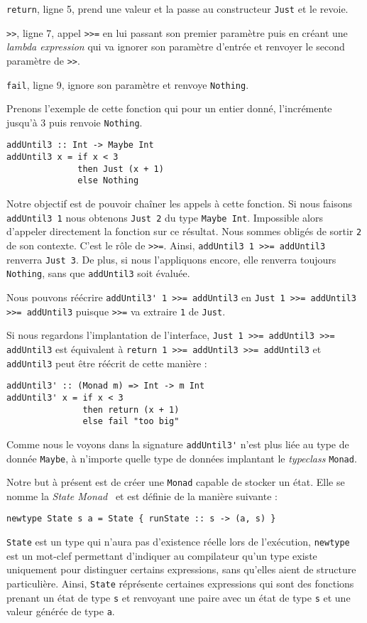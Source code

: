 \documentclass{llncs}
\begin{document}
\lstinline{return}, ligne 5, prend une valeur et la passe au constructeur
\lstinline{Just} et le revoie.

\lstinline{>>}, ligne 7, appel \lstinline{>>=} en lui passant son premier paramètre
puis en créant une \emph{lambda expression} qui va ignorer son paramètre d'entrée
et renvoyer le second paramètre de \lstinline{>>}.

\lstinline{fail}, ligne 9, ignore son paramètre et renvoye \lstinline{Nothing}.

Prenons l'exemple de cette fonction qui pour un entier donné, l'incrémente jusqu'à
3 puis renvoie \lstinline{Nothing}.
\begin{lstlisting}
addUntil3 :: Int -> Maybe Int
addUntil3 x = if x < 3
              then Just (x + 1)
              else Nothing
\end{lstlisting}

Notre objectif est de pouvoir chaîner les appels à cette fonction.
Si nous faisons \lstinline{addUntil3 1} nous obtenons \lstinline{Just 2} du type \lstinline{Maybe Int}.
Impossible alors d'appeler directement la fonction sur ce résultat.
Nous sommes obligés de sortir \lstinline{2} de son contexte.
C'est le rôle de \lstinline{>>=}.
Ainsi, \lstinline{addUntil3 1 >>= addUntil3} renverra \lstinline{Just 3}.
De plus, si nous l'appliquons encore, elle renverra toujours \lstinline{Nothing},
sans que \lstinline{addUntil3} soit évaluée.

Nous pouvons réécrire \lstinline{addUntil3' 1 >>= addUntil3} en \lstinline{Just 1 >>= addUntil3 >>= addUntil3}
puisque \lstinline{>>=} va extraire \lstinline{1} de \lstinline{Just}.

Si nous regardons l'implantation de l'interface, \lstinline{Just 1 >>= addUntil3 >>= addUntil3}
est équivalent à \lstinline{return 1 >>= addUntil3 >>= addUntil3} et \lstinline{addUntil3}
peut être réécrit de cette manière :
\begin{lstlisting}
addUntil3' :: (Monad m) => Int -> m Int
addUntil3' x = if x < 3
               then return (x + 1)
               else fail "too big"
\end{lstlisting}

Comme nous le voyons dans la signature \lstinline{addUntil3'} n'est plus liée au type
de donnée \lstinline{Maybe}, à n'importe quelle type de données implantant le \emph{typeclass}
\lstinline{Monad}.

Notre but à présent est de créer une \lstinline{Monad} capable de stocker un état.
Elle se nomme la \emph{State Monad}~\cite{PeytonJones95} et est définie de la manière
suivante :
\begin{lstlisting}
newtype State s a = State { runState :: s -> (a, s) }
\end{lstlisting}
\lstinline{State} est un type qui n'aura pas d'existence réelle lors de l'exécution,
\lstinline{newtype} est un mot-clef permettant d'indiquer au compilateur qu'un type
existe uniquement pour distinguer certains expressions, sans qu'elles aient de
structure particulière.
Ainsi, \lstinline{State} réprésente certaines expressions qui sont des fonctions
prenant un état de type \lstinline{s} et renvoyant une paire avec un état
de type \lstinline{s} et une valeur générée de type \lstinline{a}.
\end{document}
